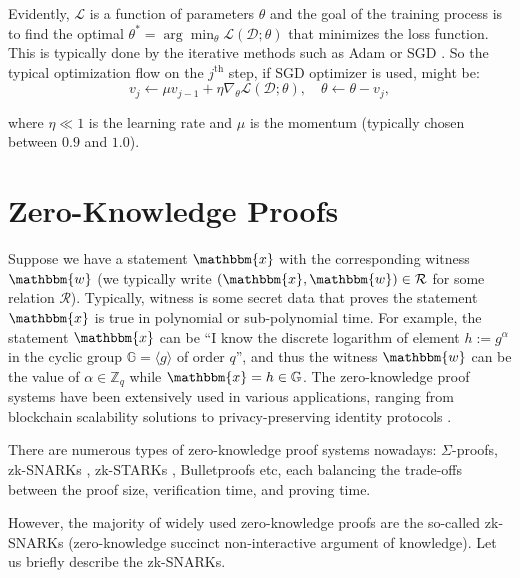 \documentclass[12pt,a4paper,oneside]{book}
\theoremstyle{dplplain}
\theoremstyle{dpldefinition}
\theoremstyle{dplremark}
\begin{document}
Evidently, $\mathcal{L}$ is a function of parameters $\theta$ and the goal of the training
process is to find the optimal $\theta^* =
\arg\min_{\theta}\mathcal{L}(\mathcal{D};\theta)$ that minimizes the loss function. This
is typically done by the iterative methods such as Adam \cite{adam} or SGD
\cite{sgd}. So the typical optimization flow on the $j^{\text{th}}$ step, if 
SGD optimizer is used, might be:
\begin{equation*}
    v_j \gets \mu v_{j-1} + \eta \nabla_{\theta}\mathcal{L}(\mathcal{D};\theta), \quad \theta \gets \theta - v_j,
\end{equation*}

where $\eta \ll 1$ is the learning rate and $\mu$ is the momentum (typically
chosen between $0.9$ and $1.0$).

\section{Zero-Knowledge Proofs}

Suppose we have a statement $\mathbbm{x}$ with the corresponding witness
$\mathbbm{w}$ (we typically write $(\mathbbm{x}, \mathbbm{w}) \in \mathcal{R}$
for some relation $\mathcal{R}$). Typically, witness is some secret data that
proves the statement $\mathbbm{x}$ is true in polynomial or sub-polynomial time.
For example, the statement $\mathbbm{x}$ can be ``I know the discrete logarithm
of element $h := g^{\alpha}$ in the cyclic group $\mathbb{G} = \langle g
\rangle$ of order $q$'', and thus the witness $\mathbbm{w}$ can be the value of
$\alpha \in \mathbb{Z}_q$ while $\mathbbm{x} = h \in \mathbb{G}$. The
zero-knowledge proof systems have been extensively used in various applications,
ranging from blockchain scalability solutions to privacy-preserving identity
protocols \cite{snark-survey}.

There are numerous types of zero-knowledge proof systems nowadays:
$\Sigma$-proofs, zk-SNARKs \cite{snark-stark-comparison}, zk-STARKs
\cite{stark}, Bulletproofs \cite{bulletproofs} etc, each balancing 
the trade-offs between the proof size, verification time, and proving time.

However, the majority of widely used zero-knowledge proofs are the so-called
zk-SNARKs (zero-knowledge succinct non-interactive argument of knowledge). Let
us briefly describe the zk-SNARKs.
\end{document}

